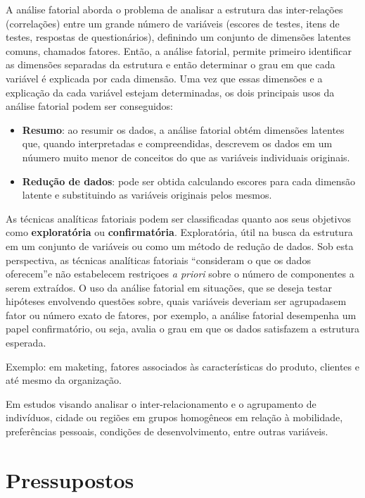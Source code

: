 \documentclass[12pt,brazil,]{book}
\begin{document}
A análise fatorial aborda o problema de analisar a estrutura das
inter-relações (correlações) entre um grande número de variáveis
(escores de testes, itens de testes, respostas de questionários),
definindo um conjunto de dimensões latentes comuns, chamados fatores.
Então, a análise fatorial, permite primeiro identificar as dimensões
separadas da estrutura e então determinar o grau em que cada variável é
explicada por cada dimensão. Uma vez que essas dimensões e a explicação
da cada variável estejam determinadas, os dois principais usos da
análise fatorial podem ser conseguidos:

\begin{itemize}
\item
  \textbf{Resumo}: ao resumir os dados, a análise fatorial obtém
  dimensões latentes que, quando interpretadas e compreendidas,
  descrevem os dados em um núumero muito menor de conceitos do que as
  variáveis individuais originais.
\item
  \textbf{Redução de dados}: pode ser obtida calculando escores para
  cada dimensão latente e substituindo as variáveis originais pelos
  mesmos.
\end{itemize}

As técnicas analíticas fatoriais podem ser classificadas quanto aos seus
objetivos como \textbf{exploratória} ou \textbf{confirmatória}.
Exploratória, útil na busca da estrutura em um conjunto de variáveis ou
como um método de redução de dados. Sob esta perspectiva, as técnicas
analíticas fatoriais ``consideram o que os dados oferecem''e não
estabelecem restriçoes \emph{a priori} sobre o número de componentes a
serem extraídos. O uso da análise fatorial em situações, que se deseja
testar hipóteses envolvendo questões sobre, quais variáveis deveriam ser
agrupadasem fator ou número exato de fatores, por exemplo, a análise
fatorial desempenha um papel confirmatório, ou seja, avalia o grau em
que os dados satisfazem a estrutura esperada.

Exemplo: em maketing, fatores associados às características do produto,
clientes e até mesmo da organização.

Em estudos visando analisar o inter-relacionamento e o agrupamento de
indivíduos, cidade ou regiões em grupos homogêneos em relação à
mobilidade, preferências pessoais, condições de desenvolvimento, entre
outras variáveis.

\hypertarget{pressupostos}{%
\section{Pressupostos}\label{pressupostos}}
\end{document}
